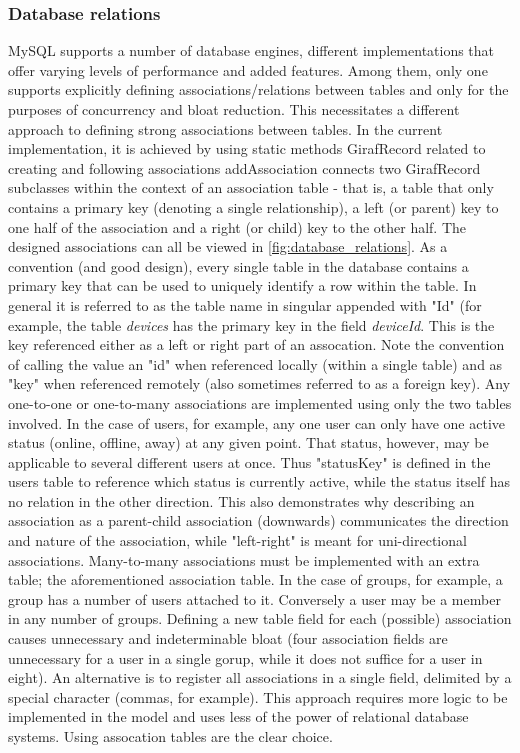 \subsubsection{Database relations}
MySQL supports a number of database engines, different implementations that offer varying levels of performance and added features. Among them, only one supports explicitly defining associations/relations between tables and only for the purposes of concurrency and bloat reduction. This necessitates a different approach to defining strong associations between tables. In the current implementation, it is achieved by using static methods GirafRecord related to creating and following associations
addAssociation connects two GirafRecord subclasses within the context of an association table - that is, a table that only contains a primary key (denoting a single relationship), a left (or parent) key to one half of the association and a right (or child) key to the other half. The designed associations can all be viewed in \vref{fig:database_relations}.
As a convention (and good design), every single table in the database contains a primary key that can be used to uniquely identify a row within the table. In general it is referred to as the table name in singular appended with "Id" (for example, the table \emph{devices} has the primary key in the field \emph{deviceId}. This is the key referenced either as a left or right part of an assocation. Note the convention of calling the value an "id" when referenced locally (within a single table) and as "key" when referenced remotely (also sometimes referred to as a foreign key).
Any one-to-one or one-to-many associations are implemented using only the two tables involved. In the case of users, for example, any one user can only have one active status (online, offline, away) at any given point. That status, however, may be applicable to several different users at once. Thus "statusKey" is defined in the users table to reference which status is currently active, while the status itself has no relation in the other direction. This also demonstrates why describing an association as a parent-child association (downwards) communicates the direction and nature of the association, while "left-right" is meant for uni-directional associations.
Many-to-many associations must be implemented with an extra table; the aforementioned association table. In the case of groups, for example, a group has a number of users attached to it. Conversely a user may be a member in any number of groups. Defining a new table field for each (possible) association causes unnecessary and indeterminable bloat (four association fields are unnecessary for a user in a single gorup, while it does not suffice for a user in eight). An alternative is to register all associations in a single field, delimited by a special character (commas, for example). This approach requires more logic to be implemented in the model and uses less of the power of relational database systems. Using assocation tables are the clear choice.
